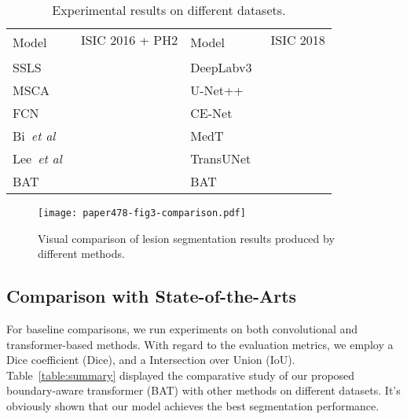 \documentclass[runningheads]{paper478-llncs}
\begin{document}
\begin{table*}[t]
    \caption{Experimental results on different datasets.}\label{table:summary}
\centering
\renewcommand\arraystretch{1.2}
\begin{tabular}{p{2cm}<{\centering}p{1.5cm}<{\centering}p{1.5cm}<{\centering}p{2cm}<{\centering}p{1.5cm}<{\centering}p{1.5cm}<{\centering}}
\hline
\hline
\multirow{2}{*}{Model} & \multicolumn{2}{c}{ISIC 2016 + PH2} & \multirow{2}{*}{Model} & \multicolumn{2}{c}{ISIC 2018}\\
 &  &  &  &  &  \\
\hline
SSLS\cite{ahn2015automated}  & &  & DeepLabv3~\cite{chen2017rethinking} & & \\
MSCA\cite{bi2016automated}  & &  & U-Net++~\cite{zhou2018unetpp} & & \\
FCN~\cite{long2015fully}   & &  & CE-Net~\cite{gu2019cenet} & & \\
Bi~\textit{et al}~\cite{7942129}  & &  & MedT~\cite{valanarasu2021medical} &  & \\
Lee~\textit{et al}~\cite{9157193}   & &  &TransUNet~\cite{chen2021transunet} & & \\
\hline
BAT & &  & BAT & & \\
\hline
\hline
\end{tabular}
\label{tab:results}
\end{table*}

\begin{figure}[t]
\centering
\texttt{[image: paper478-fig3-comparison.pdf]}
\caption{Visual comparison of lesion segmentation results produced by different methods.}
\label{fig:comparison_result}
\end{figure}



\subsection{Comparison with State-of-the-Arts}
For baseline comparisons, we run experiments on both convolutional and transformer-based methods.
With regard to the evaluation metrics, we employ a Dice coefficient (Dice), and a Intersection over Union (IoU). Table~\ref{table:summary} displayed the comparative study of our proposed boundary-aware transformer (BAT) with other methods on different datasets. It's obviously shown that our model achieves the best segmentation performance.
\end{document}
